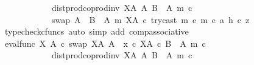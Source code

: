 \begin{isabellebody}
\ \ \ \ \ \ \ \ \ \ \ \ dist{\isacharunderscore}{\kern0pt}prod{\isacharunderscore}{\kern0pt}coprod{\isacharunderscore}{\kern0pt}inv\ {\isacharparenleft}{\kern0pt}X\isactrlbsup A\isactrlesup {\isacharparenright}{\kern0pt}\ A\ {\isacharparenleft}{\kern0pt}B\ {\isasymsetminus}\ {\isacharparenleft}{\kern0pt}A{\isacharcomma}{\kern0pt}\ m{\isacharparenright}{\kern0pt}{\isacharparenright}{\kern0pt}\ {\isasymcirc}\isactrlsub c\isanewline
\ \ \ \ \ \ \ \ \ \ \ \ swap\ {\isacharparenleft}{\kern0pt}A\ {\isasymCoprod}\ {\isacharparenleft}{\kern0pt}B\ {\isasymsetminus}\ {\isacharparenleft}{\kern0pt}A{\isacharcomma}{\kern0pt}\ m{\isacharparenright}{\kern0pt}{\isacharparenright}{\kern0pt}{\isacharparenright}{\kern0pt}\ {\isacharparenleft}{\kern0pt}X\isactrlbsup A\isactrlesup {\isacharparenright}{\kern0pt}\ {\isasymcirc}\isactrlsub c\ {\isasymlangle}{\isacharparenleft}{\kern0pt}try{\isacharunderscore}{\kern0pt}cast\ m\ {\isasymcirc}\isactrlsub c\ m{\isacharparenright}{\kern0pt}\ {\isasymcirc}\isactrlsub c\ a{\isacharcomma}{\kern0pt}\ h\ {\isasymcirc}\isactrlsub c\ z{\isasymrangle}{\isachardoublequoteclose}\isanewline
\ \ \ \ \ \ \ \ \ \ \ \ \isamarkupfalse%
\ {\isacharparenleft}{\kern0pt}typecheck{\isacharunderscore}{\kern0pt}cfuncs{\isacharcomma}{\kern0pt}\ auto\ simp\ add{\isacharcolon}{\kern0pt}\ comp{\isacharunderscore}{\kern0pt}associative{}{\isacharparenright}{\kern0pt}\isanewline
\ \ \ \ \ \ \ \ \ \ \isamarkupfalse%
\ \isamarkupfalse%
\ {\isachardoublequoteopen}{\isacharparenleft}{\kern0pt}eval{\isacharunderscore}{\kern0pt}func\ X\ A\ {\isasymcirc}\isactrlsub c\ swap\ {\isacharparenleft}{\kern0pt}X\isactrlbsup A\isactrlesup {\isacharparenright}{\kern0pt}\ A{\isacharparenright}{\kern0pt}\ {\isasymamalg}\ {\isacharparenleft}{\kern0pt}x\ {\isasymcirc}\isactrlsub c\ {\isasymbeta}\isactrlbsub X\isactrlbsup A\isactrlesup \ {\isasymtimes}\isactrlsub c\ {\isacharparenleft}{\kern0pt}B\ {\isasymsetminus}\ {\isacharparenleft}{\kern0pt}A{\isacharcomma}{\kern0pt}\ m{\isacharparenright}{\kern0pt}{\isacharparenright}{\kern0pt}\isactrlesub {\isacharparenright}{\kern0pt}\ {\isasymcirc}\isactrlsub c\isanewline
\ \ \ \ \ \ \ \ \ \ \ \ dist{\isacharunderscore}{\kern0pt}prod{\isacharunderscore}{\kern0pt}coprod{\isacharunderscore}{\kern0pt}inv\ {\isacharparenleft}{\kern0pt}X\isactrlbsup A\isactrlesup {\isacharparenright}{\kern0pt}\ A\ {\isacharparenleft}{\kern0pt}B\ {\isasymsetminus}\ {\isacharparenleft}{\kern0pt}A{\isacharcomma}{\kern0pt}\ m{\isacharparenright}{\kern0pt}{\isacharparenright}{\kern0pt}\ {\isasymcirc}\isactrlsub c\isanewline

\end{isabellebody}

